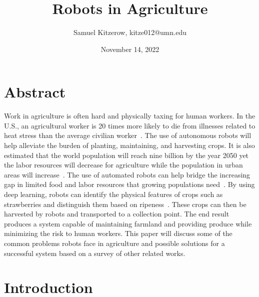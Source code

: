 \documentclass[12pt]{article}
\title{Robots in Agriculture}
\author{Samuel Kitzerow, kitze012@umn.edu}
\date{November 14, 2022}
\begin{document}
\maketitle
\section*{Abstract}
Work in agriculture is often hard and physically taxing for human workers. In the U.S., an agricultural worker is 20 times more likely to die from illnesses related to heat stress than the average civilian worker~\cite{tigchelaar2020work}. The use of autonomous robots will help alleviate the burden of planting, maintaining, and harvesting crops. It is also estimated that the world population will reach nine billion by the year 2050 yet the labor resources will decrease for agriculture while the population in urban areas will increase~\cite{9096177}. The use of automated robots can help bridge the increasing gap in limited food and labor resources that growing populations need~\cite{zhou2022intelligent}. By using deep learning, robots can identify the physical features of crops such as strawberries and distinguish them based on ripeness~\cite{yu2019fruit}. These crops can then be harvested by robots and transported to a collection point. The end result produces a system capable of maintaining farmland and providing produce while minimizing the risk to human workers. This paper will discuss some of the common problems robots face in agriculture and possible solutions for a successful system based on a survey of other related works.

\section{Introduction}

\end{document}
